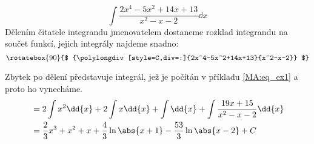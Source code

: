 \begin{mdframed}[style=mdexam]
  \begin{example}\label{mai:exam016}
    \begin{equation}\label{mai:int_ex_02}
      \int{\frac{2x^4-5x^2+14x+13}{x^2-x-2}\dd{x}}
    \end{equation}
    Dělením čitatele integrandu jmenovatelem dostaneme rozklad integrandu na součet funkcí, jejich 
    integrály najdeme snadno:
    \begin{equation*}
      \rotatebox{90}{$
        {\polylongdiv[style=C,div=:]{2x^4-5x^2+14x+13}{x^2-x-2}}
      $}
    \end{equation*}

    Zbytek po dělení představuje integrál, jež je počítán v příkladu \ref{MA:eq_ex1} a proto ho 
    vynecháme. 
    \begin{align*}
      &= 2\int x^2\dd{x} + 2\int x\dd{x} + \int\dd{x} + \int\frac{19x+15}{x^2-x-2}\dd{x}     \\
      &= \frac{2}{3}x^3 + x^2 + x + \frac{4}{3}\ln\abs{x+1} - \frac{53}{3}\ln\abs{x-2} + C 
    \end{align*}     
  \end{example}
\end{mdframed}